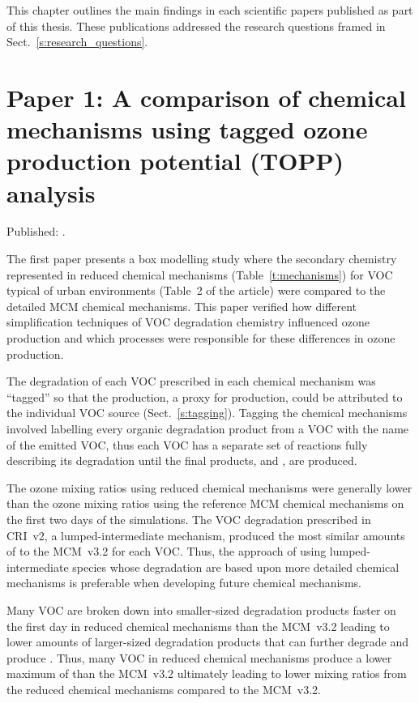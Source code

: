 This chapter outlines the main findings in each scientific papers published as part of this thesis.
These publications addressed the research questions framed in Sect.~\ref{s:research_questions}.

\singlespacing
\section[Paper 1]{Paper 1: A comparison of chemical mechanisms using tagged ozone production potential (TOPP) analysis} \label{s:chemical_mechanism_results}
\onehalfspacing

Published: .
\vspace{5mm}

The first paper presents a box modelling study where the secondary chemistry represented in reduced chemical mechanisms (Table~\ref{t:mechanisms}) for VOC typical of urban environments (Table~2 of the article) were compared to the detailed MCM chemical mechanisms.
This paper verified how different simplification techniques of VOC degradation chemistry influenced ozone production and which processes were responsible for these differences in ozone production.

The degradation of each VOC prescribed in each chemical mechanism was ``tagged'' so that the  production, a proxy for  production, could be attributed to the individual VOC source (Sect.~\ref{s:tagging}).
Tagging the chemical mechanisms involved labelling every organic degradation product from a VOC with the name of the emitted VOC, thus each VOC has a separate set of reactions fully describing its degradation until the final products,  and , are produced.

The ozone mixing ratios using reduced chemical mechanisms were generally lower than the ozone mixing ratios using the reference MCM chemical mechanisms on the first two days of the simulations.
The VOC degradation prescribed in CRI~v2, a lumped-intermediate mechanism, produced the most similar amounts of  to the MCM~v3.2 for each VOC.
Thus, the approach of using lumped-intermediate species whose degradation are based upon more detailed chemical mechanisms is preferable when developing future chemical mechanisms.

Many VOC are broken down into smaller-sized degradation products faster on the first day in reduced chemical mechanisms than the MCM~v3.2 leading to lower amounts of larger-sized degradation products that can further degrade and produce .
Thus, many VOC in reduced chemical mechanisms produce a lower maximum of  than the MCM~v3.2 ultimately leading to lower  mixing ratios from the reduced chemical mechanisms compared to the MCM~v3.2.

